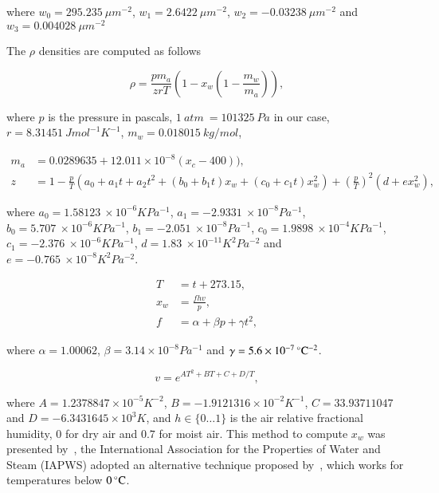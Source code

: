 where $w_0 = 295.235~\mu m^{-2}$, $w_1 = 2.6422~\mu m^{-2}$, $w_2 = -0.03238~\mu m^{-2}$ and $w_3 = 0.004028~\mu m^{-2}$

The $\rho$ densities are computed as follows

\begin{equation}
\label{eq:ciddor_rho}
\rho =  \frac{p m_a}{zrT} \left( 1 - x_w \left(1 - \frac{m_w}{m_a} \right) \right), 
\end{equation}

where $p$ is the pressure in pascals, $1~atm~ = 101 325~Pa$ in our case, $r = 8.31451~J mol^{-1} K^{-1}$, $m_w = 0.018015~kg/mol$, 

\begin{align}
\label{eq:ciddor_m_a}
m_a &= 0.0289635 + 12.011 \times 10^{-8}(x_c - 400)),\\
\label{eq:ciddor_z}
z &= 1 - \frac{p}{T} \left(a_0 + a_1 t + a_2 t^2 + \left(b_0 + b_1 t \right) x_w + \left(c_0 + c_1 t \right) x_w^2 \right) + \left( \frac{p}{T} \right)^2 \left( d + ex_w^2 \right),
\end{align}

where $a_0 = 1.58123~\times 10 ^{-6} K Pa^{-1}$,  $a_1 =-2.9331 ~\times 10 ^{-8} Pa^{-1}$,  $b_0 = 5.707~\times 10 ^{-6} K Pa^{-1}$,  $b_1 = -2.051~\times 10 ^{-8} Pa^{-1}$,  $c_0 = 1.9898~\times 10 ^{-4} K Pa^{-1}$,  $c_1 = -2.376~\times 10 ^{-6} K Pa^{-1}$,  $d = 1.83~\times 10 ^{-11} K^2 Pa^{-2}$ and  $e = -0.765~\times 10 ^{-8} K^2 Pa^{-2}$.

\begin{align}
\label{eq:ciddor_t}
T &= t + 273.15, \\
\label{eq:ciddor_x_w}
x_w &= \frac{f h v}{ p}, \\
\label{eq:ciddor_f}
f &= \alpha + \beta p + \gamma t^2,
\end{align}

where $\alpha = 1.00062$, $\beta = 3.14 \times 10^{-8} Pa^{-1}$ and $\gamma = 5.6 \times 10^{-7} \,^{\circ}{\rm C}^{-2}$.

\begin{equation}
\label{eq:ciddor_v}
v = e^{AT^2 + BT + C + D/T},
\end{equation}

where $A = 1.2378847 \times 10^{-5} K^{-2}$, $B = -1.9121316 \times 10^{-2} K^{-1}$, $C = 33.93711047$ and $D = -6.3431645 \times 10^3 K$, and $h \in \lbrace 0 \ldots 1 \rbrace$ is the air relative fractional humidity, $0$ for dry air and $0.7$ for moist air.
This method to compute $x_w$ was presented by~\cite{Davis:1992}, the International Association for the Properties of Water and Steam (IAPWS) adopted an alternative technique proposed by~\cite{Huang:1998}, which works for temperatures below $0\,^{\circ}{\rm C}$.

